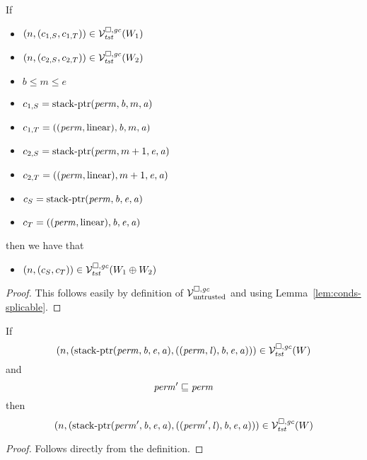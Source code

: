\begin{lemma}
  \label{lem:splicing-safety-stack}
  If
  \begin{itemize}
  \item $\left(n,(c_{1,S},c_{1,T})\right) \in \mathcal{V}^{\square,\mathit{gc}}_{\mathit{tst}}(W_1)$
  \item $\left(n,(c_{2,S},c_{2,T})\right) \in \mathcal{V}^{\square,\mathit{gc}}_{\mathit{tst}}(W_2)$
  \item $b \le m \le e$
  \item $c_{1,S} = \mathrm{stack\text{-}ptr}(\mathit{perm},\mathit{b},m,\mathit{a})$
  \item $c_{1,T} = ((\mathit{perm},\mathrm{linear}),\mathit{b},m,\mathit{a})$
  \item $c_{2,S} = \mathrm{stack\text{-}ptr}(\mathit{perm},m+1,\mathit{e},\mathit{a})$
  \item $c_{2,T} = ((\mathit{perm},\mathrm{linear}),m+1,\mathit{e},\mathit{a})$
  \item $c_S = \mathrm{stack\text{-}ptr}(\mathit{perm},\mathit{b},\mathit{e},\mathit{a})$
  \item $c_T = ((\mathit{perm},\mathrm{linear}),\mathit{b},\mathit{e},\mathit{a})$
  \end{itemize}
  then we have that
  \begin{itemize}
  \item $\left(n,(c_S,c_T)\right) \in \mathcal{V}^{\square,\mathit{gc}}_{\mathit{tst}}(W_1 \oplus W_2)$
  \end{itemize}
\end{lemma}
\begin{proof}
  This follows easily by definition of $\mathcal{V}^{\square,\mathit{gc}}_{\mathrm{untrusted}}$ and using Lemma~\ref{lem:conds-splicable}.
\end{proof}

\begin{lemma}
\label{lem:stkptr-in-lrv-mono-perm}
  If
  \[
    \left(n,(\mathrm{stack\text{-}ptr}(\mathit{perm},\mathit{b},\mathit{e},\mathit{a}),((\mathit{perm},\mathit{l}),\mathit{b},\mathit{e},\mathit{a}))\right) \in \mathcal{V}^{\square,\mathit{gc}}_{\mathit{tst}}(W)
  \]
  and
  \[
    \mathit{perm}' \sqsubseteq \mathit{perm}
  \]
  then
  \[
    \left(n,(\mathrm{stack\text{-}ptr}(\mathit{perm}',\mathit{b},\mathit{e},\mathit{a}),((\mathit{perm}',\mathit{l}),\mathit{b},\mathit{e},\mathit{a}))\right) \in \mathcal{V}^{\square,\mathit{gc}}_{\mathit{tst}}(W)
  \]
\end{lemma}
\begin{proof}
  Follows directly from the definition.
\end{proof}


